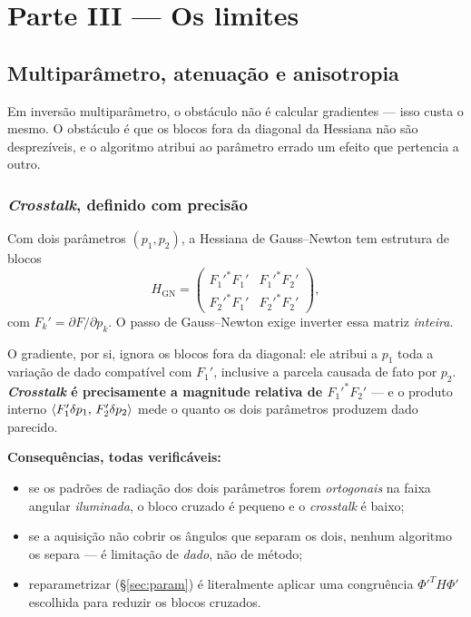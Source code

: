 \documentclass[11pt,a4paper,oneside]{report}
\begin{document}
\part*{\centering\color{azulfwi} Parte III --- Os limites}

\chapter{Multipar\^ametro, atenua\c{c}\~ao e anisotropia}
\label{cap:limites}

\begin{ideia}
Em invers\~ao multipar\^ametro, o obst\'aculo n\~ao \'e calcular gradientes ---
isso custa o mesmo. O obst\'aculo \'e que os blocos fora da diagonal da
Hessiana n\~ao s\~ao desprez\'iveis, e o algoritmo atribui ao par\^ametro
errado um efeito que pertencia a outro.
\end{ideia}

\section{\emph{Crosstalk}, definido com precis\~ao}

\begin{teoria}
Com dois par\^ametros $(p_1,p_2)$, a Hessiana de Gauss--Newton tem estrutura
de blocos
\[
H_{\text{GN}} =
\begin{pmatrix}
F_1'^{*}F_1' & F_1'^{*}F_2' \\[2pt]
F_2'^{*}F_1' & F_2'^{*}F_2'
\end{pmatrix},
\]
com $F_k' = \partial F/\partial p_k$. O passo de Gauss--Newton exige inverter
essa matriz \emph{inteira}.

O gradiente, por si, ignora os blocos fora da diagonal: ele atribui a $p_1$
toda a varia\c{c}\~ao de dado compat\'ivel com $F_1'$, inclusive a parcela
causada de fato por $p_2$. \textbf{\emph{Crosstalk} \'e precisamente a
magnitude relativa de $F_1'^{*}F_2'$} --- e o produto interno
$\langle F_1'\delta p_1,\,F_2'\delta p_2\rangle$ mede o quanto os dois par\^ametros
produzem dado parecido.

\textbf{Consequ\^encias, todas verific\'aveis:}
\begin{itemize}[leftmargin=*, itemsep=1pt]
\item se os padr\~oes de radia\c{c}\~ao dos dois par\^ametros forem
\emph{ortogonais} na faixa angular \emph{iluminada}, o bloco cruzado \'e
pequeno e o \emph{crosstalk} \'e baixo;
\item se a aquisi\c{c}\~ao n\~ao cobrir os \^angulos que separam os dois,
nenhum algoritmo os separa --- \'e limita\c{c}\~ao de \emph{dado}, n\~ao de
m\'etodo;
\item reparametrizar (§\ref{sec:param}) \'e literalmente aplicar uma
congru\^encia $\Phi'^{T}H\Phi'$ escolhida para reduzir os blocos cruzados.
\end{itemize}
\end{teoria}
\end{document}

